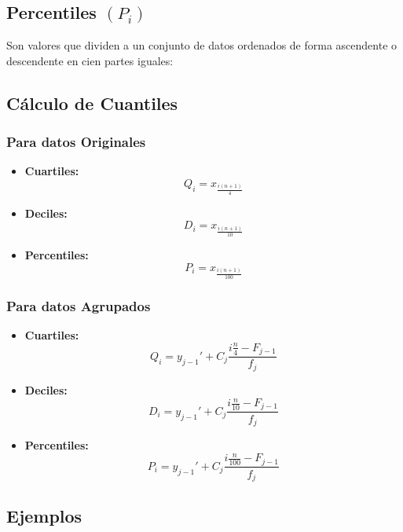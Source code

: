 \subsection{Percentiles $(P_i)$}
Son valores que dividen a un conjunto de datos ordenados de forma ascendente o descendente en cien partes iguales:
\begin{center}
\end{center}
\subsection{Cálculo de Cuantiles}
\subsubsection{Para datos Originales}
\begin{itemize}
\item \textbf{Cuartiles:}
$$Q_i=x_{\frac{i(n+1)}{4}}$$
\item \textbf{Deciles:}
$$D_i=x_{\frac{i(n+1)}{10}}$$
\item \textbf{Percentiles:}
$$P_i=x_{\frac{i(n+1)}{100}}$$
\end{itemize}
\subsubsection{Para datos Agrupados}
\begin{itemize}
\item \textbf{Cuartiles:}
$$Q_i=y_{j-1}'+C_j\dfrac{i\frac{n}{4}-F_{j-1}}{f_j}$$
\item \textbf{Deciles:}
$$D_i=y_{j-1}'+C_j\dfrac{i\frac{n}{10}-F_{j-1}}{f_j}$$
\item \textbf{Percentiles:}
$$P_i=y_{j-1}'+C_j\dfrac{i\frac{n}{100}-F_{j-1}}{f_j}$$
\end{itemize}
\subsection{Ejemplos}